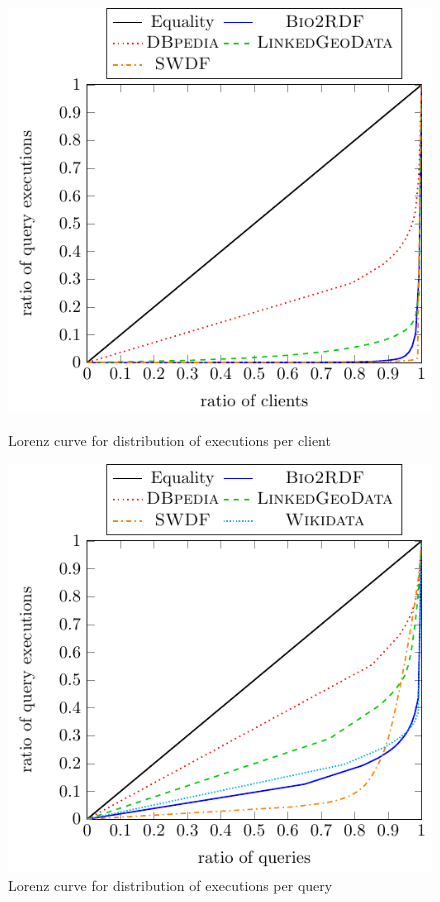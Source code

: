 \begin{figure}
\centering
\begin{minipage}{0.49\textwidth}
\includegraphics[width=\linewidth]{lorenz/client-lorenz-b2r}
\caption{Lorenz curve for distribution of executions per client}
\label{fig:client_lorenz}
\end{minipage}
\hfill
\begin{minipage}{0.49\textwidth}
\includegraphics[width=\linewidth]{lorenz/query-lorenz-b2r}
\caption{Lorenz curve for distribution of executions per query}
\label{fig:query_lorenz}
\end{minipage}
\end{figure}


